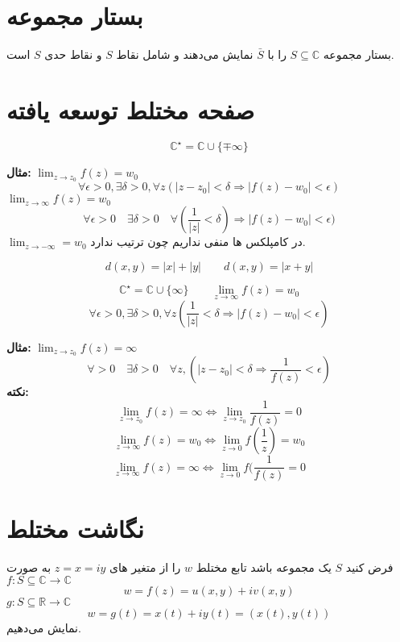 \documentclass[12pt]{report}
\begin{document}
	 	 	 	 	 	 	 	 \section{بستار مجموعه}
	 	 	 	 	 	 	 	 بستار مجموعه
	 	 	 	 	 	 	 	 	 	 	 	 	 	 $S \subseteq \mathbb{C}$
	 	 	 	 	 	 	 	 	 	 	 	 	 	 را با 
	 	 	 	 	 	 	 	 	 	 	 	 	 	 $\bar{S}$
	 	 	 	 	 	 	 	 	 	 	 	 	 	 نمایش می‌دهند و شامل نقاط
	 	 	 	 	 	 	 	 	 	 	 	 	 	 $S$
	 	 	 	 	 	 	 	 	 	 	 	 	 	 و نقاط حدی 
	 	 	 	 	 	 	 	$S$
	 	 	 	 	 	 	 	است.
	 	 	 	 	\section{صفحه مختلط توسعه یافته}
	 	 	 	 	$$\mathbb{C}^\star = \mathbb{C} \cup \{\mp \infty\}$$
	 	 	 	 	
	 	 	 	 	\textbf{مثال: }
	 	 	 	 	$\lim_{z \to z_0}f(z) = w_0$
	 	 	 	 	$$\forall \epsilon > 0 , \exists \delta > 0 , \forall z (|z - z_0|< \delta \Rightarrow |f(z) - w_0|<\epsilon)$$
	 	 	 	 	  	 $\lim_{z \to \infty} f(z) = w_0$	
	 	 	 	 	  	$$\forall \epsilon > 0 \quad \exists \delta>0 \quad \forall (\frac{1}{|z|} < \delta) \Rightarrow |f(z) - w_0| < \epsilon) $$ 
	 	 	 	 	  	$\lim_{z \to -\infty} = w_0$
	 	 	 	 	  		 	 	 	 در کامپلکس ها منفی نداریم چون ترتیب ندارد.
	 	 	 	 	 	 	 	 	 	 	 	 	 	 
	 	 	 	 
	 	 	 	 $$d(x, y) = |x| + |y| \qquad d(x, y) = |x+ y|$$
	 	 	 	 
	 	 	 	 $$\mathbb{C}^\star = \mathbb{C} \cup \{ \infty\} \qquad \lim_{z \to \infty} f(z) = w_0$$
	 	 	 	 $$\forall \epsilon > 0 , \exists \delta > 0 , \forall z (\frac{1}{|z|} < \delta \Rightarrow |f(z) - w_0| < \epsilon)$$
	 	 	 	 
	 	 	 	 
	 	 	 	 \textbf{مثال:}
	 	 	 	 $\lim_{z \to z_0} f(z) = \infty$ 
	 	 	 	 $$\forall > 0 \quad \exists \delta > 0 \quad \forall z , (|z-z_0|< \delta \Rightarrow \frac{1}{f(z)} < \epsilon)$$	 	 	 	 	 	 	 	 	 	 
	 	 	 	 \textbf{نکته:}
	 	 	 	 $$\lim_{z \to z_0} f(z) = \infty \Leftrightarrow \lim_{z \to z_0} \frac{1}{f(z)} = 0$$
	 	 	 	 $$\lim_{z \to \infty} f(z) = w_0 \Leftrightarrow \lim_{z \to 0} f(\frac{1}{z}) = w_0$$
	 	 	 	 $$\lim_{z \to \infty}f(z) = \infty \Leftrightarrow \lim_{z \to 0} f(\frac{1}{f(z)}= 0$$
	 	 	 	 
	 	 	 	 \section{نگاشت مختلط}
	 	 	 	 فرض کنید 
	 	 	 	 $S$
	 	 	 	 یک مجموعه باشد تابع مختلط 
	 	 	 	 $w$
	 	 	 	 را از متغیر های
	 	 	 	 $z = x = iy$
	 	 	 	 به صورت 
	 	 	 	 $f: S \subseteq \mathbb{C} \rightarrow \mathbb{C}$
	 	 	 	 $$w = f(z) = u(x, y) + iv(x, y)$$
	 	 	 	 $g:S \subseteq \mathbb{R} \rightarrow \mathbb{C}$
	 	 	 	 $$w = g(t) = x(t) + iy(t) = (x(t), y(t))$$
	 	 	 	 نمایش می‌دهیم.
	 	 	 	 
\end{document}
